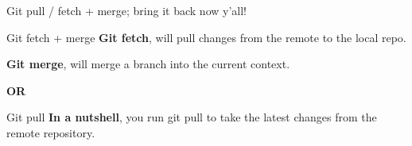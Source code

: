 \begin{frame}{Git pull / fetch + merge; bring it back now y'all!}
    \begin{block}{Git fetch + merge}
    \textbf{Git fetch}, will pull changes from the remote to the local repo.

    \textbf{Git merge}, will merge a branch into the current context. 
    \end{block}
\centering \textbf{OR}
    \begin{block}{Git pull}
    \textbf{In a nutshell}, you run git pull to take the latest changes from the remote repository. 
    \end{block}
\end{frame}
